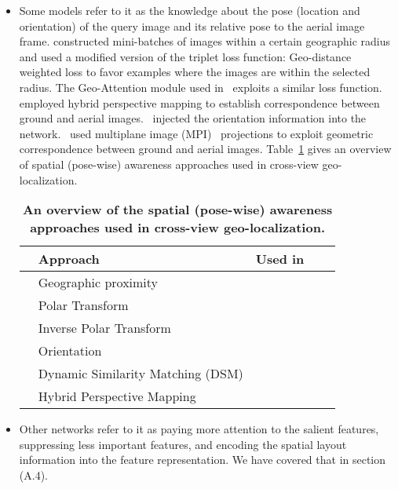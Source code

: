 \documentclass[10pt,letterpaper]{article}
\begin{document}
\begin{itemize}
  \item Some models refer to it as the knowledge about the pose (location and orientation) of the query image and its relative pose to the aerial image frame.
  \cite{bib47,bib17} constructed mini-batches of images within a certain geographic radius and used a modified version of the triplet loss function: Geo-distance weighted loss to favor examples where the images are within the selected radius. The Geo-Attention module used in~\cite{bib24} exploits a similar loss function.~\cite{bib14} employed hybrid perspective mapping to establish correspondence between ground and aerial images.~\cite{bib4} injected the orientation information into the network.~\cite{bib4} used multiplane image (MPI)~\cite{bib13} projections to exploit geometric correspondence between ground and aerial images. Table~\ref{table2} gives an overview of spatial (pose-wise) awareness approaches used in cross-view geo-localization.
  \begin{table}[!ht]
    \centering
    \caption{
    {\bf An overview of the spatial (pose-wise) awareness approaches used in cross-view geo-localization.}}
    \begin{tabular}{@{}lllll@{}}
    \toprule
    & {\bf Approach} & {\bf Used in} & \\ \midrule
    & Geographic proximity & ~\cite{bib47}~\cite{bib17}~\cite{bib24}& \\
    & Polar Transform & ~\cite{bib3,bib4}~\cite{bib5}~\cite{bib13,bib14}~\cite{bib17,bib18,bib19}& \\
    & Inverse Polar Transform & ~\cite{bib49}& \\
    & Orientation & ~\cite{bib4}& \\
    & Dynamic Similarity Matching (DSM) & ~\cite{bib13}& \\
    & Hybrid Perspective Mapping & ~\cite{bib14}& \\ \bottomrule
    \end{tabular}
    \label{table2}
  \end{table}
  \item Other networks refer to it as paying more attention to the salient features, suppressing less important features, and encoding the spatial layout information into the feature representation. We have covered that in section (A.4).
\end{itemize}
\end{document}
